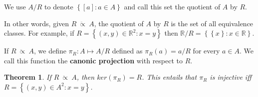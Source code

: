 \documentclass[a4paper, 12pt]{article}
\newtheorem{theorem}{Theorem}
\newtheorem{theorem}{Theorem}
\begin{document}
\begin{definition}
    We use $A / R$ to denote $\left\{ [a] : a \in A \right\} $ and call this set
    the quotient of $A$ by $R$.
\end{definition}

In other words, given $R ~ \ddot{\propto} ~A$, the quotient of $A$ by $R$ is the
set of all equivalence classes. For example, if $R = \left\{ (x, y) \in
\mathbb{R}^2 : x = y \right\} $ then $\mathbb{R} / R = \left\{ \left\{ x \right\}  : x \in
\mathbb{R} \right\} $. 

\begin{definition}
    If $R ~ \ddot{\propto} ~A$, we define $\pi_R : A \mapsto A / R$ defined as
    $\pi_R(a) = a /R$ for every $a \in A$. We call this function the
    \textbf{canonic projection} with respect to $R$.
\end{definition}

\begin{theorem}
    If $R ~ \ddot{\propto} ~A$, then $ker(\pi_R) = R$. This entails that $\pi_R$
    is injective iff $R = \left\{ (x, y) \in A^2 : x = y \right\} $.
\end{theorem}
\end{document}
